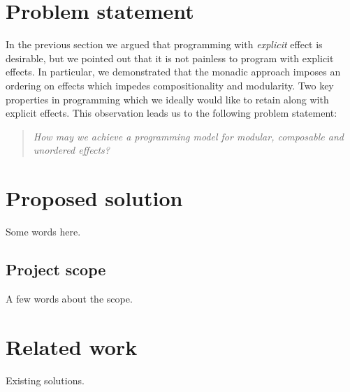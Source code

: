 \section{Problem statement}
In the previous section we argued that programming with \emph{explicit} effect is desirable, but we pointed out that it is not  painless to program with explicit effects. In particular, we demonstrated that the monadic approach imposes an ordering on effects which impedes compositionality and modularity. Two key properties in programming which we ideally would like to retain along with explicit effects. This observation leads us to the following problem statement:
\begin{quote}
  \emph{How may we achieve a programming model for modular, composable and unordered effects?}
\end{quote}

\section{Proposed solution}
Some words here.
\subsection{Project scope}
A few words about the scope.

\section{Related work}
Existing solutions.


